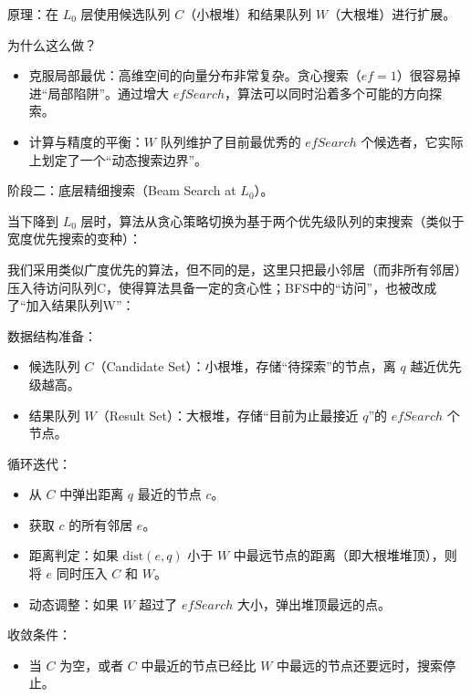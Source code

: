 原理：在 \(L_0\) 层使用候选队列 \(C\)（小根堆）和结果队列 \(W\)（大根堆）进行扩展。

为什么这么做？

\begin{itemize}
\tightlist
\item
  克服局部最优：高维空间的向量分布非常复杂。贪心搜索（\(ef=1\)）很容易掉进``局部陷阱''。通过增大 \(efSearch\)，算法可以同时沿着多个可能的方向探索。
\item
  计算与精度的平衡：\(W\) 队列维护了目前最优秀的 \(efSearch\) 个候选者，它实际上划定了一个``动态搜索边界''。
\end{itemize}

阶段二：底层精细搜索（Beam Search at \(L_0\)）。

当下降到 \(L_0\) 层时，算法从贪心策略切换为基于两个优先级队列的束搜索（类似于宽度优先搜索的变种）：

我们采用类似广度优先的算法，但不同的是，这里只把最小邻居（而非所有邻居）压入待访问队列C，使得算法具备一定的贪心性；BFS中的``访问''，也被改成了``加入结果队列W''：

数据结构准备：

\begin{itemize}
\tightlist
\item
  候选队列 \(C\)（Candidate Set）：小根堆，存储``待探索''的节点，离 \(q\) 越近优先级越高。
\item
  结果队列 \(W\)（Result Set）：大根堆，存储``目前为止最接近 \(q\)''的 \(efSearch\) 个节点。
\end{itemize}

循环迭代：

\begin{itemize}
\tightlist
\item
  从 \(C\) 中弹出距离 \(q\) 最近的节点 \(c\)。
\item
  获取 \(c\) 的所有邻居 \(e\)。
\item
  距离判定：如果 \(\mathrm{dist}(e,q)\) 小于 \(W\) 中最远节点的距离（即大根堆堆顶），则将 \(e\) 同时压入 \(C\) 和 \(W\)。
\item
  动态调整：如果 \(W\) 超过了 \(efSearch\) 大小，弹出堆顶最远的点。
\end{itemize}

收敛条件：

\begin{itemize}
\tightlist
\item
  当 \(C\) 为空，或者 \(C\) 中最近的节点已经比 \(W\) 中最远的节点还要远时，搜索停止。
\end{itemize}


